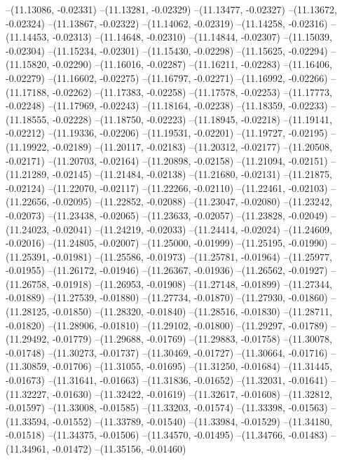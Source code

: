 --(11.13086, -0.02331)
--(11.13281, -0.02329)
--(11.13477, -0.02327)
--(11.13672, -0.02324)
--(11.13867, -0.02322)
--(11.14062, -0.02319)
--(11.14258, -0.02316)
--(11.14453, -0.02313)
--(11.14648, -0.02310)
--(11.14844, -0.02307)
--(11.15039, -0.02304)
--(11.15234, -0.02301)
--(11.15430, -0.02298)
--(11.15625, -0.02294)
--(11.15820, -0.02290)
--(11.16016, -0.02287)
--(11.16211, -0.02283)
--(11.16406, -0.02279)
--(11.16602, -0.02275)
--(11.16797, -0.02271)
--(11.16992, -0.02266)
--(11.17188, -0.02262)
--(11.17383, -0.02258)
--(11.17578, -0.02253)
--(11.17773, -0.02248)
--(11.17969, -0.02243)
--(11.18164, -0.02238)
--(11.18359, -0.02233)
--(11.18555, -0.02228)
--(11.18750, -0.02223)
--(11.18945, -0.02218)
--(11.19141, -0.02212)
--(11.19336, -0.02206)
--(11.19531, -0.02201)
--(11.19727, -0.02195)
--(11.19922, -0.02189)
--(11.20117, -0.02183)
--(11.20312, -0.02177)
--(11.20508, -0.02171)
--(11.20703, -0.02164)
--(11.20898, -0.02158)
--(11.21094, -0.02151)
--(11.21289, -0.02145)
--(11.21484, -0.02138)
--(11.21680, -0.02131)
--(11.21875, -0.02124)
--(11.22070, -0.02117)
--(11.22266, -0.02110)
--(11.22461, -0.02103)
--(11.22656, -0.02095)
--(11.22852, -0.02088)
--(11.23047, -0.02080)
--(11.23242, -0.02073)
--(11.23438, -0.02065)
--(11.23633, -0.02057)
--(11.23828, -0.02049)
--(11.24023, -0.02041)
--(11.24219, -0.02033)
--(11.24414, -0.02024)
--(11.24609, -0.02016)
--(11.24805, -0.02007)
--(11.25000, -0.01999)
--(11.25195, -0.01990)
--(11.25391, -0.01981)
--(11.25586, -0.01973)
--(11.25781, -0.01964)
--(11.25977, -0.01955)
--(11.26172, -0.01946)
--(11.26367, -0.01936)
--(11.26562, -0.01927)
--(11.26758, -0.01918)
--(11.26953, -0.01908)
--(11.27148, -0.01899)
--(11.27344, -0.01889)
--(11.27539, -0.01880)
--(11.27734, -0.01870)
--(11.27930, -0.01860)
--(11.28125, -0.01850)
--(11.28320, -0.01840)
--(11.28516, -0.01830)
--(11.28711, -0.01820)
--(11.28906, -0.01810)
--(11.29102, -0.01800)
--(11.29297, -0.01789)
--(11.29492, -0.01779)
--(11.29688, -0.01769)
--(11.29883, -0.01758)
--(11.30078, -0.01748)
--(11.30273, -0.01737)
--(11.30469, -0.01727)
--(11.30664, -0.01716)
--(11.30859, -0.01706)
--(11.31055, -0.01695)
--(11.31250, -0.01684)
--(11.31445, -0.01673)
--(11.31641, -0.01663)
--(11.31836, -0.01652)
--(11.32031, -0.01641)
--(11.32227, -0.01630)
--(11.32422, -0.01619)
--(11.32617, -0.01608)
--(11.32812, -0.01597)
--(11.33008, -0.01585)
--(11.33203, -0.01574)
--(11.33398, -0.01563)
--(11.33594, -0.01552)
--(11.33789, -0.01540)
--(11.33984, -0.01529)
--(11.34180, -0.01518)
--(11.34375, -0.01506)
--(11.34570, -0.01495)
--(11.34766, -0.01483)
--(11.34961, -0.01472)
--(11.35156, -0.01460)
